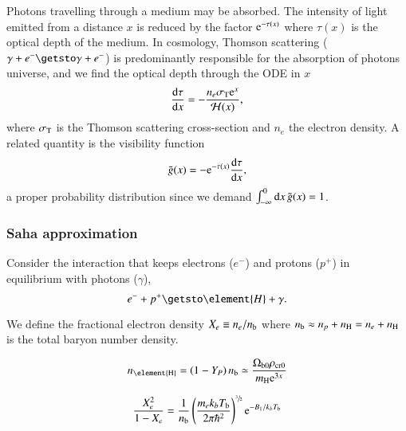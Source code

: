 
Photons travelling through a medium may be absorbed. The intensity of light emitted from a distance $x$ is reduced by the factor $\mathrm{e}^{-\tau(x)}$ where $\tau(x)$ is the optical depth of the medium. In cosmology, Thomson scattering ($\gamma + e^{-} \getsto \gamma+ e^{-}$) is predominantly responsible for the absorption of photons universe, and we find the optical depth through the ODE in $x$
\begin{equation}\label{mil2:theo:eq:ode_tau_of_x}
    \dv{\tau}{x} = - \frac{n_e \sigma_\mathrm{T}\mathrm{e}^{x}}{\mathcal{H}(x)},
\end{equation}
where $\sigma_\mathrm{T}$ is the Thomson scattering cross-section and $n_e$ the electron density. A related quantity is the visibility function
\begin{equation}\label{mil2:theo:eq:gt_of_x}
    \tilde{g}(x)= - \mathrm{e}^{-\tau(x)} \dv{\tau}{x},
\end{equation}
a proper probability distribution since we demand $\int_{-\infty}^{0}\mathrm{d} x\, \tilde{g}(x) = 1$. 

\subsubsection{Saha approximation}\label{mil2:theo:sec:Saha}
    Consider the interaction that keeps electrons ($e^{-}$) and protons ($p^{+}$) in equilibrium with photons ($\gamma$),
    \begin{equation}\label{mil2:theo:eq:relevant_interaction}
        e^{-} + p^{+} \getsto \element{H}+\gamma.
    \end{equation}
    
    We define the fractional electron density $X_e\equiv n_e/n_\mathrm{b}$ where $n_\mathrm{b} \approx n_p + n_\mathrm{H} = n_e +n_\mathrm{H}$ is the total baryon number density. 

    \begin{equation}
        n\ped{\element{H}} = \left(1-Y_P\right) n\ped{b} \simeq \frac{\Omega\ped{b0}\rho\ped{cr0}}{m\ped{H}\eu^{3x}}
    \end{equation}

    \begin{equation}\label{mil2:theo:eq:Saha}
        \frac{X_e^2}{1-X_e}= \frac{1}{n_\mathrm{b}}\left(\frac{m_e k_b T_\mathrm{b}}{2\pi \hbar^2} \right)^{\sfrac{3}{2}} \mathrm{e}^{-B_1/k_b T_\mathrm{b}}
    \end{equation}



